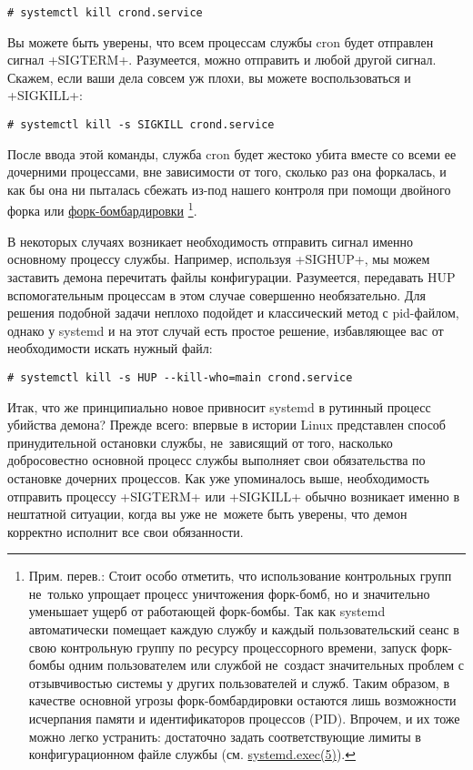 \documentclass[10pt,oneside,a4paper]{article}
\begin{document}
\begin{Verbatim}
# systemctl kill crond.service
\end{Verbatim}

Вы можете быть уверены, что всем процессам службы cron будет отправлен сигнал
+SIGTERM+. Разумеется, можно отправить и любой другой сигнал. Скажем, если ваши
дела совсем уж плохи, вы можете воспользоваться и +SIGKILL+: 

\begin{Verbatim}
# systemctl kill -s SIGKILL crond.service
\end{Verbatim}

После ввода этой команды, служба cron будет жестоко убита вместе со всеми ее
дочерними процессами, вне зависимости от того, сколько раз она форкалась, и
как бы она ни пыталась сбежать из-под нашего контроля при помощи двойного
форка или
\href{http://ru.wikipedia.org/wiki/Fork-%D0%B1%D0%BE%D0%BC%D0%B1%D0%B0}{форк-бомбардировки}%
\footnote{Прим. перев.: Стоит особо отметить, что использование контрольных
групп не~только упрощает процесс уничтожения форк-бомб, но и значительно
уменьшает ущерб от работающей форк-бомбы. Так как systemd автоматически помещает
каждую службу и каждый пользовательский сеанс в свою контрольную группу по
ресурсу процессорного времени, запуск форк-бомбы одним пользователем или службой
не~создаст значительных проблем с отзывчивостью системы у других пользователей и
служб. Таким образом, в качестве основной угрозы форк-бомбардировки остаются
лишь возможности исчерпания памяти и идентификаторов процессов (PID). Впрочем, и
их тоже можно легко устранить: достаточно задать соответствующие лимиты в
конфигурационном файле службы (см.
\href{http://www.0pointer.de/public/systemd-man/systemd.exec.html}{systemd.exec(5)}).}.

В некоторых случаях возникает необходимость отправить сигнал именно основному
процессу службы. Например, используя +SIGHUP+, мы можем заставить демона
перечитать файлы конфигурации. Разумеется, передавать HUP вспомогательным
процессам в этом случае совершенно необязательно. Для решения подобной задачи
неплохо подойдет и классический метод с pid-файлом, однако у systemd и на этот
случай есть простое решение, избавляющее вас от необходимости искать нужный
файл: 

\begin{Verbatim}
# systemctl kill -s HUP --kill-who=main crond.service
\end{Verbatim}

Итак, что же принципиально новое привносит systemd в рутинный процесс
убийства демона? Прежде всего: впервые в истории Linux представлен способ
принудительной остановки службы, не~зависящий от того, насколько
добросовестно основной процесс службы выполняет свои обязательства по
остановке дочерних процессов. Как уже упоминалось выше, необходимость
отправить процессу +SIGTERM+ или +SIGKILL+ обычно возникает именно
в нештатной ситуации, когда вы уже не~можете быть уверены, что демон
корректно исполнит все свои обязанности.
\end{document}
